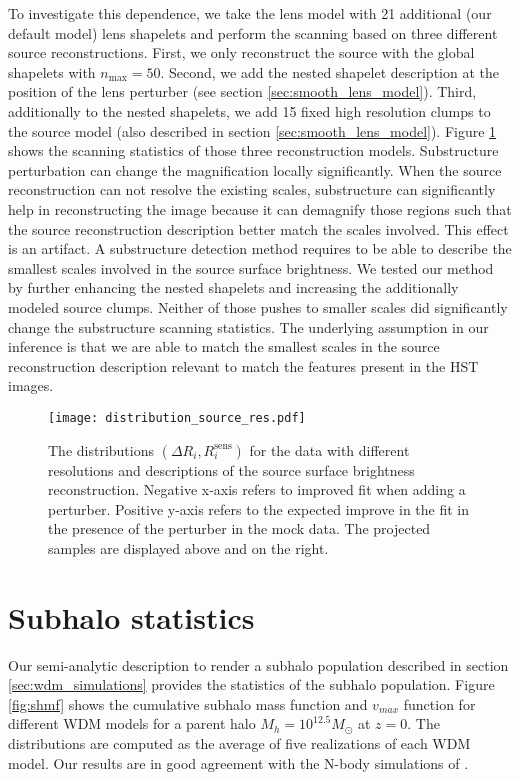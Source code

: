 \documentclass[a4paper,11pt]{article}
\begin{document}
To investigate this dependence, we take the lens model with 21 additional (our default model) lens shapelets and perform the scanning based on three different source reconstructions. First, we only reconstruct the source with the global shapelets with $n_{\text{max}}=50$. Second, we add the nested shapelet description at the position of the lens perturber (see section \ref{sec:smooth_lens_model}). Third, additionally to the nested shapelets, we add 15 fixed high resolution clumps to the source model (also described in section \ref{sec:smooth_lens_model}). Figure \ref{fig:distribution_source_res} shows the scanning statistics of those three reconstruction models. Substructure perturbation can change the magnification locally significantly. When the source reconstruction can not resolve the existing scales, substructure can significantly help in reconstructing the image because it can demagnify those regions such that the source reconstruction description better match the scales involved. This effect is an artifact. A substructure detection method requires to be able to describe the smallest scales involved in the source surface brightness. We tested our method by further enhancing the nested shapelets and increasing the additionally modeled source clumps. Neither of those pushes to smaller scales did significantly change the substructure scanning statistics. The underlying assumption in our inference is that we are able to match the smallest scales in the source reconstruction description relevant to match the features present in the HST images.

\begin{figure}
  \centering
  \texttt{[image: distribution\_source\_res.pdf]}
  \caption{The distributions $\left(\Delta R_i, R^{\text{sens}}_i \right)$ for the data with different resolutions and descriptions of the source surface brightness reconstruction. Negative x-axis refers to improved fit when adding a perturber. Positive y-axis refers to the expected improve in the fit in the presence of the perturber in the mock data. The projected samples are displayed above and on the right.}
  \label{fig:distribution_source_res}
\end{figure}




\section{Subhalo statistics}\label{app:subhalo_stat}
Our semi-analytic description to render a subhalo population described in section \ref{sec:wdm_simulations} provides the statistics of the subhalo population. Figure \ref{fig:shmf} shows the cumulative subhalo mass function and $v_{max}$ function for different WDM models for a parent halo $M_h = 10^{12.5}M_{\odot}$ at $z=0$. The distributions are computed as the average of five realizations of each WDM model. Our results are in good agreement with the N-body simulations of \cite{Lovell:2012p15140}.
\end{document}
